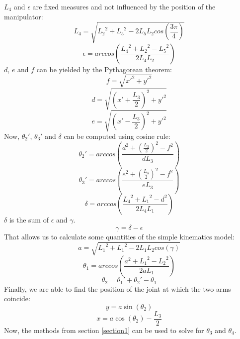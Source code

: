 \documentclass{sig-alternate-05-2015}
\begin{document}
$L_4$ and $\epsilon$ are fixed measures and not influenced by the position of the manipulator:
\begin{equation}
L_4 = \sqrt{{L_2}^2 + {L_5}^2 - 2L_5L_2cos\left(\frac{3\pi}{4}\right)}
\label{eqn:L4}
\end{equation}
\begin{equation}
\epsilon = arccos\left(  \frac{{L_4}^2 + {L_2}^2 - {L_5}^2}{2L_4L_2} \right)
\label{eqn:tepsilon}
\end{equation}
$d$, $e$ and $f$ can be yielded by the Pythagorean theorem:
\begin{equation}
f = \sqrt{{x'}^2 + {y'}^2}
\label{eqn:f}
\end{equation}
\begin{equation}
d = \sqrt{\left(x'+ \frac{L_3}{2}\right)^2 + {y'}^2}
\end{equation}
\begin{equation}
e = \sqrt{\left(x'- \frac{L_3}{2}\right)^2 + {y'}^2}
\end{equation}
Now, $\theta_2'$, $\theta_3'$ and $\delta$ can be computed using cosine rule:
\begin{equation}
\theta_2' = arccos\left(  \frac{d^2 + (\frac{L_3}{2})^2 - f^2}{dL_3} \right)
\label{eqn:theta2prime}
\end{equation}
\begin{equation}
\theta_3' = arccos\left(  \frac{e^2 + (\frac{L_3}{2})^2 - f^2}{eL_3} \right)
\label{eqn:theta3prime}
\end{equation}
\begin{equation}
\delta = arccos\left(  \frac{{L_4}^2 + {L_1}^2 - d^2}{2L_4L_1} \right)
\label{eqn:delta}
\end{equation}
$\delta$ is the sum of $\epsilon$ and $\gamma$.
\begin{equation}
\gamma = \delta - \epsilon
\end{equation}
That allows us to calculate some quantities of the simple kinematics model:
\begin{equation}
a = \sqrt{{L_1}^2 + {L_1}^2 - 2L_1L_2cos\left(\gamma\right)}
\end{equation}
\begin{equation}
\theta_1 = arccos\left(  \frac{a^2 + {L_1}^2 - {L_2}^2}{2aL_1} \right)
\end{equation}
\begin{equation}
\theta_2 = \theta_1' + \theta_2' - \theta_1
\end{equation}
Finally, we are able to find the position of the joint at which the two arms coincide:
\begin{equation}
y = a \sin(\theta_2)
\end{equation}
\begin{equation}
x = a\cos(\theta_2) - \frac{L_3}{2}
\end{equation}
Now, the methods from section \ref{section1} can be used to solve for $\theta_3$ and $\theta_4$.
\end{document}
